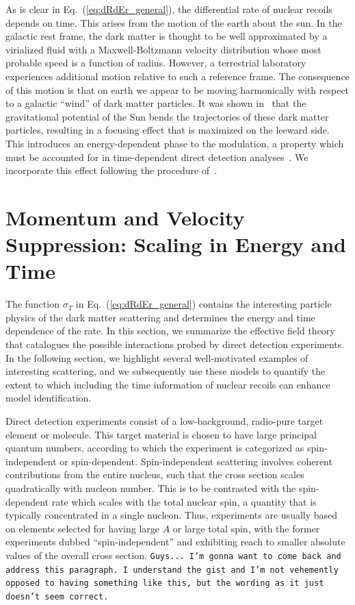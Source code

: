 \documentclass[11pt]{article}
\newcommand{\Eq}[1]{Eq.~(\ref{#1})} \newcommand{\Eqs}[2]{Eqs.~(\ref{#1}) and (\ref{#2})} \newcommand{\Eqm}[2]{Eqs.~(\ref{#1}) through (\ref{#2})}
\newcommand{\sjwColor}{red}
\newcommand{\sjwtt}[1]{{\color{\sjwColor}\tt #1}}
\begin{document}
As is clear in \Eq{eq:dRdEr_general}, the differential rate of nuclear recoils depends on time. This arises from the motion of the earth about the sun. In the galactic rest frame, the dark matter is thought to be well approximated by a virialized fluid with a Maxwell-Boltzmann velocity distribution whose most probable speed is a function of radius. However, a terrestrial laboratory experiences additional motion relative to such a reference frame. The consequence of this motion is that on earth we appear to be moving harmonically with respect to a galactic ``wind'' of dark matter particles. It was shown in~\cite{Danby01021957,Griest:1987vc,Sikivie:2002bj,Alenazi:2006wu} that the gravitational potential of the Sun bends the trajectories of these dark matter particles, resulting in a focusing effect that is maximized on the leeward side. This introduces an energy-dependent phase to the modulation, a property which must be accounted for in time-dependent direct detection analyses~\cite{Lee:2013wza,Bozorgnia:2014dqa,DelNobile:2015nua}. We incorporate this effect following the procedure of~\cite{Lee:2013wza}. 




\section{Momentum and Velocity Suppression: Scaling in Energy and Time}

The function $\sigma_T$ in \Eq{eq:dRdEr_general} contains the interesting particle physics of the dark matter scattering and determines the energy and time dependence of the rate. In this section, we summarize the effective field theory that catalogues the possible interactions probed by direct detection experiments. In the following section, we highlight several well-motivated examples of interesting scattering, and we subsequently use these models to quantify the extent to which including the time information of nuclear recoils can enhance model identification.

Direct detection experiments consist of a low-background, radio-pure target element or molecule. This target material is chosen to have large principal quantum numbers, according to which the experiment is categorized as spin-independent or spin-dependent. Spin-independent scattering involves coherent contributions from the entire nucleus, such that the cross section scales quadratically with nucleon number. This is to be contrasted with the spin-dependent rate which scales with the total nuclear spin, a quantity that is typically concentrated in a single nucleon. Thus, experiments are usually based on elements selected for having large $A$ or large total spin, with the former experiments dubbed ``spin-independent'' and exhibiting reach to smaller absolute values of the overall cross section. \sjwtt{Guys... I'm gonna want to come back and address this paragraph. I understand the gist and I'm not vehemently opposed to having something like this, but the wording as it just doesn't seem correct.} 
\end{document}
